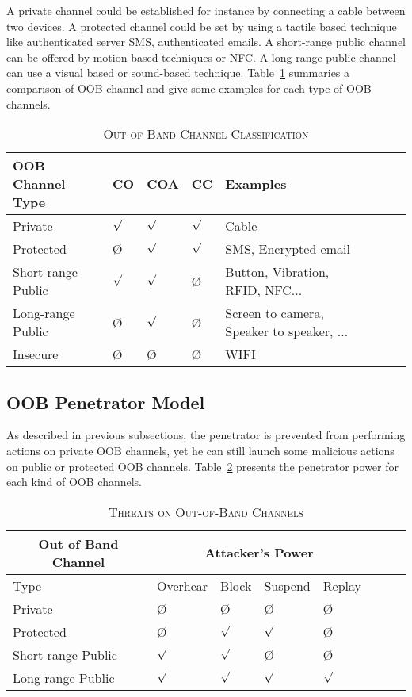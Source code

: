 A private channel could be established for instance by connecting a cable between two devices. A protected channel could be set by using a tactile based technique like authenticated server SMS, authenticated emails. A short-range public channel can be offered by motion-based techniques or NFC. A long-range public channel can use a visual based or sound-based technique. Table~\ref{tableproperties} summaries a comparison of OOB channel and give some examples for each type of OOB channels.

\begin{table}
\centering
\caption{\textsc{Out-of-Band Channel Classification}}
\label{tableproperties}
{\scriptsize
\begin{tabular}{ l l l l l l l l | }
\hline
OOB Channel Type & CO & COA & CC & Examples \\
\hline\hline
Private & $\surd$ & $\surd$ & $\surd$ & Cable \\ \hline
Protected & \O & $\surd$ & $\surd$ & SMS, Encrypted email \\ \hline
Short-range Public & $\surd$ & $\surd$ & \O & Button, Vibration, RFID, NFC... \\ \hline
Long-range Public & \O & $\surd$& \O & Screen to camera, Speaker to speaker, ... \\ \hline
Insecure & \O & \O & \O & WIFI \\ 
\end{tabular}
}
\end{table}


\subsection{OOB Penetrator Model}

As described in previous subsections, the penetrator is prevented from performing actions on private OOB channels, yet he can still launch some malicious actions on public or protected OOB channels. Table~\ref{tableattack} presents the penetrator power for each kind of OOB channels.

\begin{table}
\centering
\caption{\textsc{Threats on Out-of-Band Channels}}
\label{tableattack}
{\scriptsize
\begin{tabular}{ l l l l l l l l | }
\hline
\multicolumn{1}{c}{Out of Band Channel} & \multicolumn{4}{c}{Attacker's Power} \\
\hline
\hline
Type & Overhear & Block & Suspend & Replay \\
\hline\hline
Private & \O & \O & \O & \O  \\ \hline
Protected & \O & $\surd$ & $\surd$ & \O  \\ \hline
Short-range Public & $\surd$ & $\surd$ & \O & \O  \\ \hline
Long-range Public & $\surd$ & $\surd$ & $\surd$& $\surd$ \\ \hline
\end{tabular}
}
\end{table}

